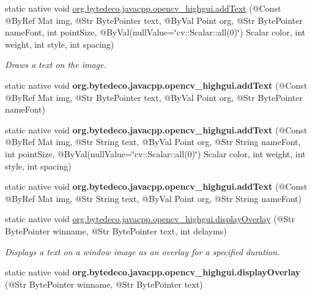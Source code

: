\begin{DoxyCompactItemize}
\item 
static native void \hyperlink{group__highgui__qt_ga7595781df35faa10eff729ed3e41b5fd}{org.\+bytedeco.\+javacpp.\+opencv\+\_\+highgui.\+add\+Text} (@Const @By\+Ref Mat img, @Str Byte\+Pointer text, @By\+Val Point org, @Str Byte\+Pointer name\+Font, int point\+Size, @By\+Val(null\+Value=\char`\"{}cv\+::\+Scalar\+::all(0)\char`\"{}) Scalar color, int weight, int style, int spacing)
\begin{DoxyCompactList}\small\item\em Draws a text on the image. \end{DoxyCompactList}\item 
\mbox{\label{group__highgui__qt_ga6412b7ed2f66fe41c4fa0b92a6fa4d46}} 
static native void {\bfseries org.\+bytedeco.\+javacpp.\+opencv\+\_\+highgui.\+add\+Text} (@Const @By\+Ref Mat img, @Str Byte\+Pointer text, @By\+Val Point org, @Str Byte\+Pointer name\+Font)
\item 
\mbox{\label{group__highgui__qt_gad3d4abbb9eed25736b2f19189d75cc0c}} 
static native void {\bfseries org.\+bytedeco.\+javacpp.\+opencv\+\_\+highgui.\+add\+Text} (@Const @By\+Ref Mat img, @Str String text, @By\+Val Point org, @Str String name\+Font, int point\+Size, @By\+Val(null\+Value=\char`\"{}cv\+::\+Scalar\+::all(0)\char`\"{}) Scalar color, int weight, int style, int spacing)
\item 
\mbox{\label{group__highgui__qt_gaeb7bf4176b36e382ec908bf7647bb945}} 
static native void {\bfseries org.\+bytedeco.\+javacpp.\+opencv\+\_\+highgui.\+add\+Text} (@Const @By\+Ref Mat img, @Str String text, @By\+Val Point org, @Str String name\+Font)
\item 
static native void \hyperlink{group__highgui__qt_ga70784449604551e57ffd968370f887a8}{org.\+bytedeco.\+javacpp.\+opencv\+\_\+highgui.\+display\+Overlay} (@Str Byte\+Pointer winname, @Str Byte\+Pointer text, int delayms)
\begin{DoxyCompactList}\small\item\em Displays a text on a window image as an overlay for a specified duration. \end{DoxyCompactList}\item 
\mbox{\label{group__highgui__qt_gacfdd6244fcfd3e885c981714cf8fe73f}} 
static native void {\bfseries org.\+bytedeco.\+javacpp.\+opencv\+\_\+highgui.\+display\+Overlay} (@Str Byte\+Pointer winname, @Str Byte\+Pointer text)

\end{DoxyCompactItemize}
